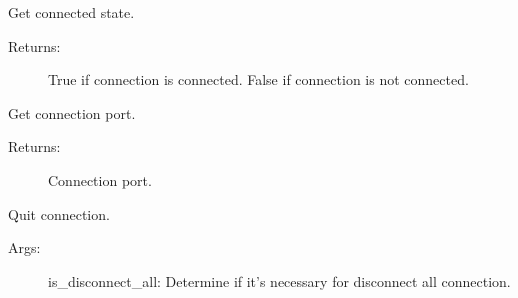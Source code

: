 \documentclass[letterpaper,10pt,english]{sphinxmanual}
\begin{document}
\begin{fulllineitems}
\begin{fulllineitems}
\begin{description}
\end{description}

\end{fulllineitems}


\begin{fulllineitems}
\label{\detokenize{QConnectionLibrary:QConnectionLibrary.tcp.tcp_base.TCPBase.is_connected}}
\sphinxAtStartPar
Get connected state.
\begin{description}
\item[{Returns:}] \leavevmode
\sphinxAtStartPar
True if connection is connected.
False if connection is not connected.

\end{description}

\end{fulllineitems}


\begin{fulllineitems}
\label{\detokenize{QConnectionLibrary:QConnectionLibrary.tcp.tcp_base.TCPBase.port}}
\sphinxAtStartPar
Get connection port.
\begin{description}
\item[{Returns:}] \leavevmode
\sphinxAtStartPar
Connection port.

\end{description}

\end{fulllineitems}


\begin{fulllineitems}
\label{\detokenize{QConnectionLibrary:QConnectionLibrary.tcp.tcp_base.TCPBase.quit}}
\sphinxAtStartPar
Quit connection.
\begin{description}
\item[{Args:}] \leavevmode
\sphinxAtStartPar
is\_disconnect\_all: Determine if it’s necessary for disconnect all connection.


\end{description}
\end{fulllineitems}
\end{fulllineitems}
\end{document}
